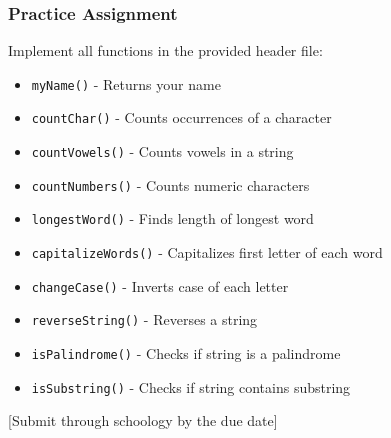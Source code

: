 \documentclass{beamer}
\begin{document}
\begin{frame}
    \frametitle{Practice Assignment}
    
    Implement all functions in the provided header file:
    
    \begin{itemize}
        \item \texttt{myName()} - Returns your name
        \item \texttt{countChar()} - Counts occurrences of a character
        \item \texttt{countVowels()} - Counts vowels in a string
        \item \texttt{countNumbers()} - Counts numeric characters
        \item \texttt{longestWord()} - Finds length of longest word
        \item \texttt{capitalizeWords()} - Capitalizes first letter of each word
        \item \texttt{changeCase()} - Inverts case of each letter
        \item \texttt{reverseString()} - Reverses a string
        \item \texttt{isPalindrome()} - Checks if string is a palindrome
        \item \texttt{isSubstring()} - Checks if string contains substring
    \end{itemize}
    
    \alert{[Submit through schoology by the due date]}
\end{frame}
\end{document}
